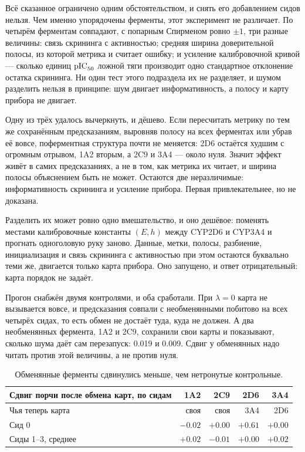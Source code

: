 Всё сказанное ограничено одним обстоятельством, и снять его добавлением сидов нельзя. Чем
именно упорядочены ферменты, этот эксперимент не различает. По четырём ферментам совпадают, с попарным Спирменом ровно $\pm 1$,
три разные величины: связь скрининга с активностью; средняя ширина доверительной полосы, из
которой метрика и считает ошибку; и усиление калибровочной кривой --- сколько единиц $\mathrm{pIC}_{50}$
ложной тяги производит одно стандартное отклонение остатка скрининга. Ни один тест этого
подраздела их не разделяет, и шумом разделить нельзя в принципе: шум двигает информативность,
а полосу и карту прибора не двигает.

Одну из трёх удалось вычеркнуть, и дёшево. Если пересчитать метрику по тем же сохранённым
предсказаниям, выровняв полосу на всех ферментах или убрав её вовсе, поферментная структура
почти не меняется: 2D6 остаётся худшим с огромным отрывом, 1A2 вторым, а 2C9 и 3A4 --- около
нуля. Значит эффект живёт в самих предсказаниях, а не в том, как метрика их читает, и ширина
полосы объяснением быть не может. Остаются две неразличимые: информативность скрининга и
усиление прибора. Первая привлекательнее, но не доказана.

Разделить их может ровно одно вмешательство, и оно дешёвое: поменять местами калибровочные
константы $(E, h)$ между CYP2D6 и CYP3A4 и прогнать одноголовую руку заново. Данные, метки,
полосы, разбиение, инициализация и связь скрининга с активностью при этом остаются буквально
теми же, двигается только карта прибора. Оно запущено, и ответ отрицательный: карта порядок
не задаёт.

Прогон снабжён двумя контролями, и оба сработали. При $\lambda = 0$ карта не вызывается
вовсе, и предсказания совпали с необменянными побитово на всех четырёх сидах, то есть обмен
не достаёт туда, куда не должен. А два необменянных фермента, 1A2 и 2C9, сохранили свои
карты и показывают, сколько шума даёт сам перезапуск: 0.019 и 0.009. Сдвиг у обменянных надо
читать против этой величины, а не против нуля.

\begin{table}[htbp]\centering\small
\begin{tabularx}{\textwidth}{@{}Xrrrr@{}}
\toprule
Сдвиг порчи после обмена карт, по сидам & 1A2 & 2C9 & \textbf{2D6} & \textbf{3A4} \\
\midrule
Чья теперь карта      & своя & своя & 3A4 & 2D6 \\
Сид 0                 & $-0.02$ & $+0.00$ & $\mathbf{+0.61}$ & $+0.00$ \\
Сиды 1--3, среднее    & $+0.02$ & $-0.01$ & $+0.00$ & $+0.02$ \\
\bottomrule
\end{tabularx}
\caption{Обменянные ферменты сдвинулись меньше, чем нетронутые контрольные.}
\label{tab:swap}
\end{table}

